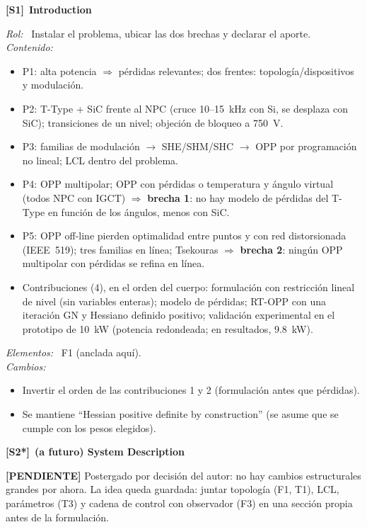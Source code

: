 \documentclass[11pt,a4paper]{article}
\newcommand{\bloque}[2]{%
  \vspace{2mm}\noindent
  {\color{IDblue}\textbf{[#1]}}\ \textbf{#2}\par\vspace{0.5mm}}
\newcommand{\campo}[1]{\noindent\textit{#1:}\ }
\newcommand{\pendiente}[1]{{\color{Warn}\textbf{[PENDIENTE]} #1}}
\begin{document}
\bloque{S1}{Introduction}
\campo{Rol} Instalar el problema, ubicar las dos brechas y declarar el aporte.\\
\campo{Contenido}
\begin{itemize}
\item P1: alta potencia $\Rightarrow$ pérdidas relevantes; dos frentes:
      topología/dispositivos y modulación.
\item P2: T-Type + SiC frente al NPC (cruce 10--15~kHz con Si, se desplaza con
      SiC); transiciones de un nivel; objeción de bloqueo a 750~V.
\item P3: familias de modulación $\rightarrow$ SHE/SHM/SHC $\rightarrow$ OPP
      por programación no lineal; LCL dentro del problema.
\item P4: OPP multipolar; OPP con pérdidas o temperatura y ángulo virtual
      (todos NPC con IGCT) $\Rightarrow$ \textbf{brecha 1}: no hay modelo de
      pérdidas del T-Type en función de los ángulos, menos con SiC.
\item P5: OPP off-line pierden optimalidad entre puntos y con red
      distorsionada (IEEE~519); tres familias en línea; Tsekouras
      $\Rightarrow$ \textbf{brecha 2}: ningún OPP multipolar con pérdidas se
      refina en línea.
\item Contribuciones (4), en el orden del cuerpo: formulación con
      restricción lineal de nivel (sin variables enteras); modelo de
      pérdidas; RT-OPP con una iteración GN y Hessiano definido positivo;
      validación experimental en el prototipo de 10~kW (potencia
      redondeada; en resultados, 9.8~kW).
\end{itemize}
\campo{Elementos} F1 (anclada aquí).\\
\campo{Cambios}
\begin{itemize}
\item Invertir el orden de las contribuciones 1 y 2 (formulación antes que
      pérdidas).
\item Se mantiene ``Hessian positive definite by construction'' (se asume
      que se cumple con los pesos elegidos).
\end{itemize}

\bloque{S2*}{(a futuro) System Description}
\pendiente{Postergado por decisión del autor: no hay cambios estructurales
grandes por ahora. La idea queda guardada: juntar topología (F1, T1), LCL,
parámetros (T3) y cadena de control con observador (F3) en una sección
propia antes de la formulación.}
\end{document}

